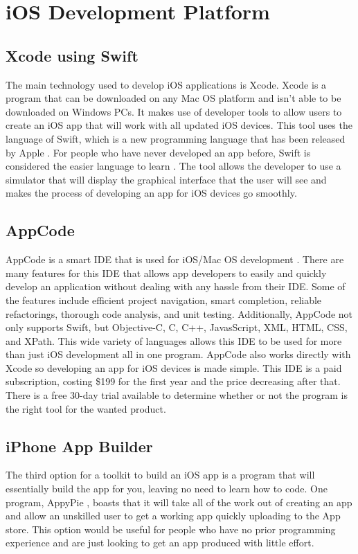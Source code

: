 \documentclass[letterpaper,10pt,draftclsnofoot,onecolumn,titlepage]{IEEEtran}
\begin{document}
	\section{iOS Development Platform}
	\subsection{Xcode using Swift}
	The main technology used to develop iOS applications is Xcode.
	Xcode is a program that can be downloaded on any Mac OS platform and isn't able to be downloaded on Windows PCs.
	It makes use of developer tools to allow users to create an iOS app that will work with all updated iOS devices.
	This tool uses the language of Swift, which is a new programming language that has been released by Apple \cite{AppleSwift}.
	For people who have never developed an app before, Swift is considered the easier language to learn \cite{CodeChris}.
	The tool allows the developer to use a simulator that will display the graphical interface that the user will see and makes the process of developing an app for iOS devices go smoothly.

	\subsection{AppCode}
	AppCode is a smart IDE that is used for iOS/Mac OS development \cite{AppCode}.
	There are many features for this IDE that allows app developers to easily and quickly develop an application without dealing with any hassle from their IDE.
	Some of the features include efficient project navigation, smart completion, reliable refactorings, thorough code analysis, and unit testing.
	Additionally, AppCode not only supports Swift, but Objective-C, C, C++, JavasScript, XML, HTML, CSS, and XPath.
	This wide variety of languages allows this IDE to be used for more than just iOS development all in one program.
	AppCode also works directly with Xcode so developing an app for iOS devices is made simple.
	This IDE is a paid subscription, costing \$199 for the first year and the price decreasing after that.
	There is a free 30-day trial available to determine whether or not the program is the right tool for the wanted product.
	\subsection{iPhone App Builder}
	The third option for a toolkit to build an iOS app is a program that will essentially build the app for you, leaving no need to learn how to code.
	One program, AppyPie \cite{AppyPie}, boasts that it will take all of the work out of creating an app and allow an unskilled user to get a working app quickly uploading to the App store.
	This option would be useful for people who have no prior programming experience and are just looking to get an app produced with little effort.
\end{document}
